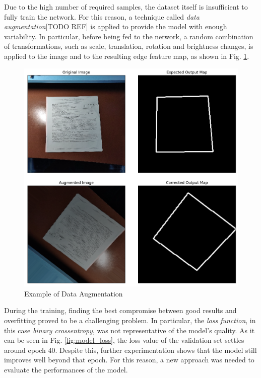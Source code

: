 \documentclass[a4paper]{article}
\begin{document}
Due to the high number of required samples, the dataset itself is insufficient to fully train the network.
For this reason, a technique called \textit{data augmentation}[TODO REF] is applied to provide the model
with enough variability. In particular, before being fed to the network, a random combination of transformations, such as scale, translation, rotation and brightness changes, is applied to the image and to the resulting edge feature map, as shown in Fig. \ref{fig:augmented_image}.

\begin{figure}[H]
	\includegraphics[width=\linewidth]{augmented_image.png}
	\caption{Example of Data Augmentation}
	\label{fig:augmented_image}
\end{figure}

During the training, finding the best compromise between good results and overfitting proved to be a challenging problem. In particular, the \textit{loss function}, in this case \textit{binary crossentropy}, 
was not representative of the model's quality. As it can be seen in Fig. \ref{fig:model_loss}, the loss value of the validation set settles around epoch 40. Despite this, further experimentation shows that the model still improves well beyond that epoch. For this reason, a new approach was needed to evaluate the performances of the model.
\end{document}
